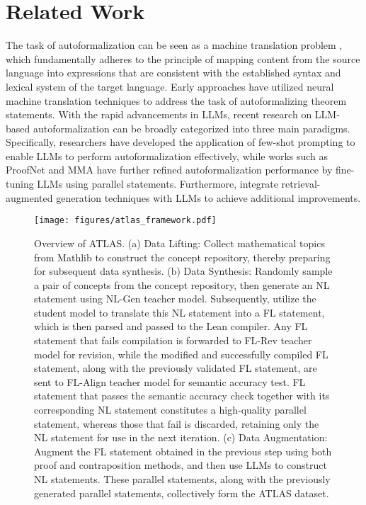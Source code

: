 \section{Related Work}
The task of autoformalization can be seen as a machine translation problem \citep{autoformalization_as_translation}, which fundamentally adheres to the principle of mapping content from the source language into expressions that are consistent with the established syntax and lexical system of the target language. Early approaches \citep{nmt_1, nmt_2} have utilized neural machine translation techniques to address the task of autoformalizing theorem statements. With the rapid advancements in LLMs, recent research on LLM-based autoformalization can be broadly categorized into three main paradigms. Specifically, researchers \citep{llm_icl_1, llm_icl_2, llm_icl_3} have developed the application of few-shot prompting to enable LLMs to perform autoformalization effectively, while works such as ProofNet \citep{proofnet} and MMA \citep{mma} have further refined autoformalization performance by fine-tuning LLMs using parallel statements. Furthermore, \citet{rag} integrate retrieval-augmented generation techniques with LLMs to achieve additional improvements. 

\begin{figure*}[!htbp]
\centering
\texttt{[image: figures/atlas\_framework.pdf]}
\caption{Overview of ATLAS. (a) Data Lifting: Collect mathematical topics from Mathlib to construct the concept repository, thereby preparing for subsequent data synthesis. (b) Data Synthesis: Randomly sample a pair of concepts from the concept repository, then generate an NL statement using NL-Gen teacher model. Subsequently, utilize the student model to translate this NL statement into a FL statement, which is then parsed and passed to the Lean compiler. Any FL statement that fails compilation is forwarded to FL-Rev teacher model for revision, while the modified and successfully compiled FL statement, along with the previously validated FL statement, are sent to FL-Align teacher model for semantic accuracy test. FL statement that passes the semantic accuracy check together with its corresponding NL statement constitutes a high-quality parallel statement, whereas those that fail is discarded, retaining only the NL statement for use in the next iteration. (c) Data Augmentation: Augment the FL statement obtained in the previous step using both proof and contraposition methods, and then use LLMs to construct NL statements. These parallel statements, along with the previously generated parallel statements, collectively form the ATLAS dataset.}
\label{fig:framework}
\end{figure*}

